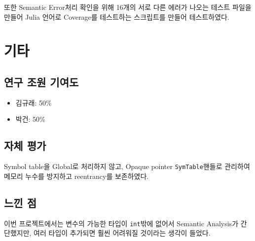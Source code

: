 \documentclass[a4paper, 10pt]{oblivoir}
\begin{document}
또한 Semantic Error처리 확인을 위해 16개의 서로 다른 에러가 나오는 테스트 파일을 만들어 Julia 언어로 Coverage를 테스트하는 스크립트를 만들어 테스트하였다.

\section{기타}

\subsection{연구 조원 기여도}

\begin{itemize}
	\item 김규래: 50\%
	\item 박건: 50\%
\end{itemize}

\subsection{자체 평가}

Symbol table을 Global로 처리하지 않고, Opaque pointer \texttt{SymTable}핸들로 관리하여 메모리 누수를 방지하고 reentrancy를 보존하였다.

\subsection{느낀 점}

이번 프로젝트에서는 변수의 가능한 타입이 \texttt{int}밖에 없어서 Semantic Analysis가 간단했지만, 여러 타입이 추가되면 훨씬 어려워질 것이라는 생각이 들었다.
\end{document}
